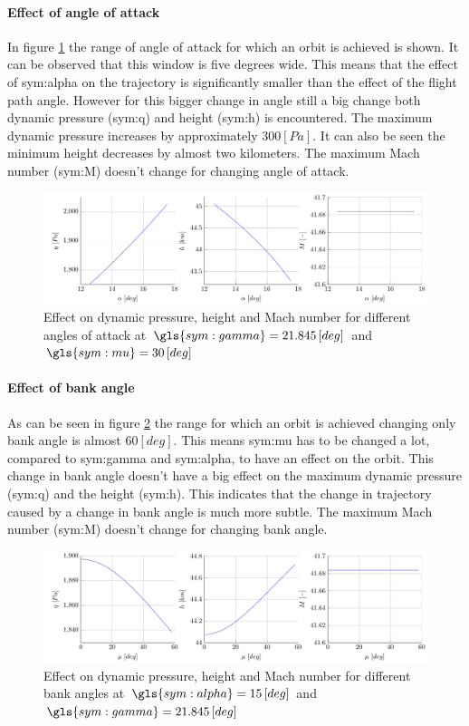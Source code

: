 \paragraph{Effect of angle of attack}

In figure \ref{fig:effectalpha} the range of angle of attack for which an orbit is achieved is shown. It can be observed that this window is five degrees wide. This means that the effect of \gls{sym:alpha} on the trajectory is significantly smaller than the effect of the flight path angle. However for this bigger change in angle still a big change both dynamic pressure (\gls{sym:q}) and height (\gls{sym:h}) is encountered. The maximum dynamic pressure increases by approximately $300 \left[Pa\right]$. It can also be seen the minimum height decreases by almost two kilometers. The maximum Mach number (\gls{sym:M}) doesn't change for changing angle of attack.
\begin{figure}[H]
	\centering
	\includegraphics[width=\textwidth]{./Figure/orbit/effectalpha.pdf}
	\caption{Effect on dynamic pressure, height and Mach number for different angles of attack at $\gls{sym:gamma}=21.845 \left[deg\right]$ and $\gls{sym:mu}=30 \left[deg\right]$}
	\label{fig:effectalpha}
\end{figure}

\paragraph{Effect of bank angle}

As can be seen in figure \ref{fig:effectmu} the range for which an orbit is achieved changing only bank angle is almost $60 \left[deg\right]$. This means \gls{sym:mu} has to be changed a lot, compared to \gls{sym:gamma} and \gls{sym:alpha}, to have an effect on the orbit. This change in bank angle doesn't have a big effect on the maximum dynamic pressure (\gls{sym:q}) and the height (\gls{sym:h}). This indicates that the change in trajectory caused by a change in bank angle is much more subtle. The maximum Mach number (\gls{sym:M}) doesn't change for changing bank angle.
\begin{figure}[H]
	\centering
	\includegraphics[width=\textwidth]{./Figure/orbit/effectmu.pdf}
	\caption{Effect on dynamic pressure, height and Mach number for different bank angles at $\gls{sym:alpha}=15 \left[deg\right]$ and $\gls{sym:gamma}=21.845 \left[deg\right]$}
	\label{fig:effectmu}
\end{figure}


